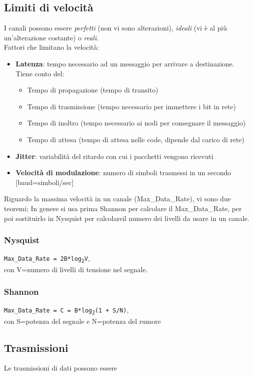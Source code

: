 \documentclass[a4paper,11pt]{article}
\def\code#1{\texttt{#1}}
\begin{document}
\newpage \subsection{Limiti di velocità}
I canali possono essere \textit{perfetti} (non vi sono alterazioni), \textit{ideali} (vi è al più un'alterazione costante) o \textit{reali}.\\
Fattori che limitano la velocità:
\begin{itemize}
\item\textbf{Latenza}: tempo necessario ad un messaggio per arrivare a destinazione. Tiene conto del:
\begin{itemize}
\item Tempo di propagazione (tempo di transito)
\item Tempo di trasmissione (tempo necessario per immettere i bit in rete)
\item Tempo di inoltro (tempo necessario ai nodi per consegnare il messaggio)
\item Tempo di attesa (tempo di attesa nelle code, dipende dal carico di rete)
\end{itemize}
\item\textbf{Jitter}: variabilità del ritardo con cui i pacchetti vengono ricevuti
\item\textbf{Velocità di modulazione}: numero di simboli trasmessi in un secondo [baud=simboli/sec]
\end{itemize}
Riguardo la massima velocità in un canale (Max\_Data\_Rate), vi sono due teoremi; In genere si usa prima Shannon per calcolare il Max\_Data\_Rate, per poi sostituirlo in Nysquist per calcolareil numero dei livelli da usare in un canale.
\subsubsection{Nysquist}
\code{Max\_Data\_Rate = 2B*log\textsubscript{2}V},\\con V=numero di livelli di tensione nel segnale.
\subsubsection{Shannon}
\code{Max\_Data\_Rate = C = B*log\textsubscript{2}(1 + S/N)},\\ con S=potenza del segnale e N=potenza del rumore
\newpage
\subsection{Trasmissioni}
Le trasmissioni di dati possono essere 
\end{document}
